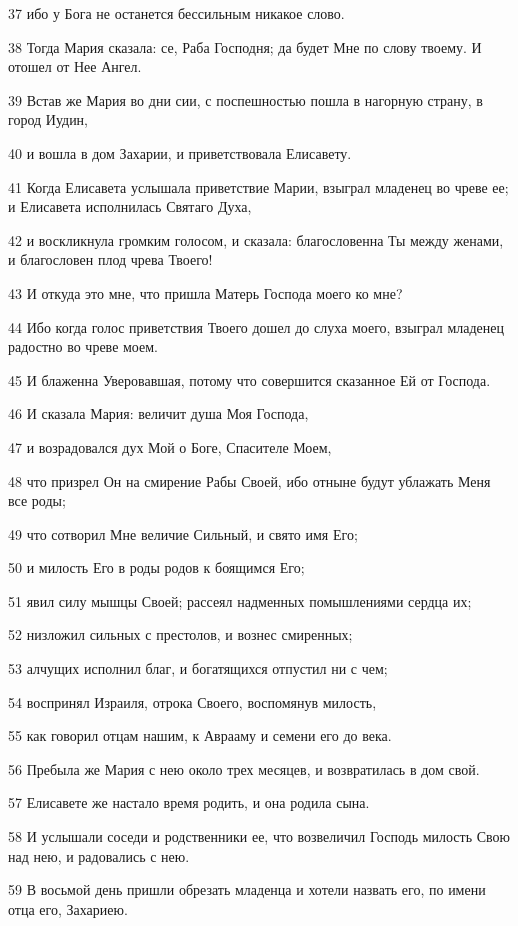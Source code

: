\par 37 ибо у Бога не останется бессильным никакое слово.
\par 38 Тогда Мария сказала: се, Раба Господня; да будет Мне по слову твоему. И отошел от Нее Ангел.
\par 39 Встав же Мария во дни сии, с поспешностью пошла в нагорную страну, в город Иудин,
\par 40 и вошла в дом Захарии, и приветствовала Елисавету.
\par 41 Когда Елисавета услышала приветствие Марии, взыграл младенец во чреве ее; и Елисавета исполнилась Святаго Духа,
\par 42 и воскликнула громким голосом, и сказала: благословенна Ты между женами, и благословен плод чрева Твоего!
\par 43 И откуда это мне, что пришла Матерь Господа моего ко мне?
\par 44 Ибо когда голос приветствия Твоего дошел до слуха моего, взыграл младенец радостно во чреве моем.
\par 45 И блаженна Уверовавшая, потому что совершится сказанное Ей от Господа.
\par 46 И сказала Мария: величит душа Моя Господа,
\par 47 и возрадовался дух Мой о Боге, Спасителе Моем,
\par 48 что призрел Он на смирение Рабы Своей, ибо отныне будут ублажать Меня все роды;
\par 49 что сотворил Мне величие Сильный, и свято имя Его;
\par 50 и милость Его в роды родов к боящимся Его;
\par 51 явил силу мышцы Своей; рассеял надменных помышлениями сердца их;
\par 52 низложил сильных с престолов, и вознес смиренных;
\par 53 алчущих исполнил благ, и богатящихся отпустил ни с чем;
\par 54 воспринял Израиля, отрока Своего, воспомянув милость,
\par 55 как говорил отцам нашим, к Аврааму и семени его до века.
\par 56 Пребыла же Мария с нею около трех месяцев, и возвратилась в дом свой.
\par 57 Елисавете же настало время родить, и она родила сына.
\par 58 И услышали соседи и родственники ее, что возвеличил Господь милость Свою над нею, и радовались с нею.
\par 59 В восьмой день пришли обрезать младенца и хотели назвать его, по имени отца его, Захариею.
